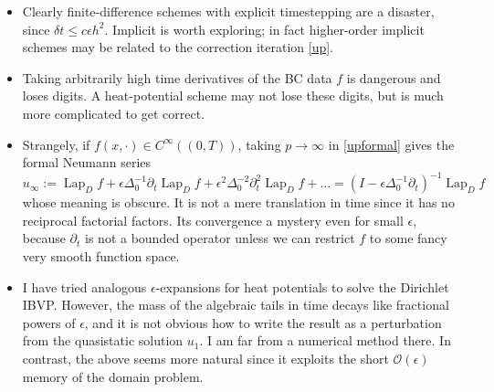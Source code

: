 \documentclass[10pt]{article}
\newcommand{\bi}{\begin{itemize}}
\newcommand{\ei}{\end{itemize}}
\newcommand{\be}{\begin{equation}}
\newcommand{\ee}{\end{equation}}
\newcommand{\bigO}{{\mathcal O}}
\newcommand{\eps}{\epsilon}
\newcommand{\dt}{\partial_t}
\DeclareMathOperator{\Lap}{Lap}
\begin{document}
\bi
\item
  Clearly finite-difference schemes with explicit timestepping are
  a disaster, since $\delta t \le c \eps h^2$.
  Implicit is worth exploring; in fact higher-order
  implicit schemes may be related to the correction iteration \eqref{up}.
\item
  Taking arbitrarily high time derivatives of the BC data $f$ is dangerous
  and loses digits. A heat-potential scheme may not lose these digits,
  but is much more complicated to get correct.
\item
Strangely, if $f(x,\cdot) \in C^\infty((0,T))$,
taking $p\to\infty$ in \eqref{upformal} gives the formal Neumann series
\be
u_\infty := \Lap_D f + \eps \Delta_0^{-1} \dt \Lap_D f + \eps^2 \Delta_0^{-2} \dt^2 \Lap_D f + \dots
= (I - \eps \Delta_0^{-1} \dt)^{-1} \Lap_D f
\ee
whose meaning is obscure.
It is not a mere translation in time since it has no
reciprocal factorial factors. Its convergence a mystery
even for small $\eps$, because $\dt$ is not a bounded operator
unless we can restrict $f$ to some fancy very smooth function space.
\item
  I have tried analogous $\eps$-expansions for heat potentials
  to solve the Dirichlet IBVP.
  However, the mass of the algebraic tails in time decays like
  fractional powers of $\eps$, and it is not obvious how to
  write the result as a perturbation from the quasistatic solution $u_1$.
  I am far from a numerical method there. In contrast, the above seems
  more natural since it exploits the short $\bigO(\eps)$ memory of
  the domain problem.
\ei




\end{document}

